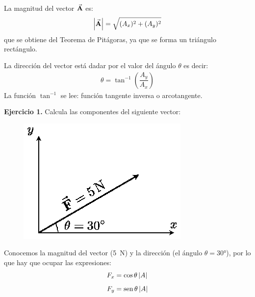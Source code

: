 \documentclass[14pt]{extarticle}
\renewcommand{\sin}{\operatorname{sen}}
\begin{document}
La magnitud del vector $\va{A}$ es:
\begin{align*}
\abs{\va{A}} = \sqrt{(A_{x})^{2} + (A_{y})^{2}}
\end{align*}
que se obtiene del Teorema de Pitágoras, ya que se forma un triángulo rectángulo.
\begin{figure}[H]
    \centering
\end{figure}

La dirección del vector está dadar por el valor del ángulo $\theta$ es decir:
\begin{align*}
\theta = \tan^{-1} \left( \dfrac{A_y}{A_{x}} \right)
\end{align*}
La función $\tan^{-1}$ se lee: función tangente inversa o arcotangente.

\textbf{Ejercicio 1. } Calcula las componentes del siguiente vector:
\begin{figure}[H]
    \centering
    \includegraphics[scale=1.2]{Imagenes/Componentes_Vector_04.eps}
\end{figure}

Conocemos la magnitud del vector (\SI{5}{\newton}) y la dirección (el ángulo $\theta = \ang{30}$), por lo que hay que ocupar las expresiones:
\begin{align*}
F_{x} &= \cos \theta \, \abs{A} \\[0.5em] 
F_{y} &= \sin \theta \, \abs{A}    
\end{align*}
\end{document}
